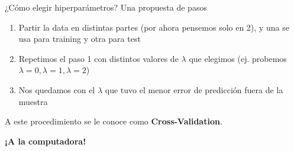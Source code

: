 \documentclass[11pt,handout,aspectratio=169]{beamer}
\begin{document}
\begin{frame}{¿Cómo elegir hiperparámetros?}
Una propuesta de pasos
\begin{enumerate}
\item Partir la data en distintas partes (por ahora pensemos solo en 2), y una se usa para training y otra para test 
\item Repetimos el paso 1 con distintos valores de $\lambda$ que elegimos (ej. probemos $\lambda=0, \lambda=1, \lambda=2$)
\item Nos quedamos con el $\lambda$ que tuvo el menor error de predicción fuera de la muestra
\end{enumerate}
\vspace{0.8cm}

A este procedimiento se le conoce como \textbf{Cross-Validation}. 
\end{frame}

\begin{frame}
\begin{center}
{\Huge \textbf{¡A la computadora!}}
\end{center}
\end{frame}
\end{document}
